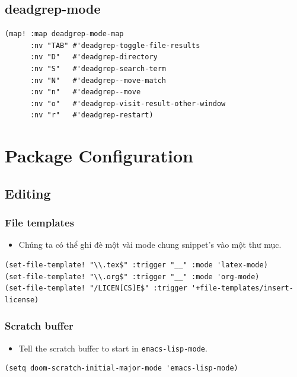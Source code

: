 \documentclass[11pt]{article}
\begin{document}
\subsection{deadgrep-mode}
\label{sec:org41fec7d}

\begin{verbatim}
(map! :map deadgrep-mode-map
      :nv "TAB" #'deadgrep-toggle-file-results
      :nv "D"   #'deadgrep-directory
      :nv "S"   #'deadgrep-search-term
      :nv "N"   #'deadgrep--move-match
      :nv "n"   #'deadgrep--move
      :nv "o"   #'deadgrep-visit-result-other-window
      :nv "r"   #'deadgrep-restart)

\end{verbatim}

\section{Package Configuration}
\label{sec:org18d5b46}
\subsection{Editing}
\label{sec:org4824af3}
\subsubsection{File templates}
\label{sec:orgc73ed8b}
\begin{itemize}
\item Chúng ta có thể ghi đè một vài mode chung snippet's vào một thư mục.
\end{itemize}

\begin{verbatim}
(set-file-template! "\\.tex$" :trigger "__" :mode 'latex-mode)
(set-file-template! "\\.org$" :trigger "__" :mode 'org-mode)
(set-file-template! "/LICEN[CS]E$" :trigger '+file-templates/insert-license)
\end{verbatim}

\subsubsection{Scratch buffer}
\label{sec:org8c041ff}
\begin{itemize}
\item Tell the scratch buffer to start in \texttt{emacs-lisp-mode}.
\end{itemize}

\begin{verbatim}
(setq doom-scratch-initial-major-mode 'emacs-lisp-mode)
\end{verbatim}
\end{document}
